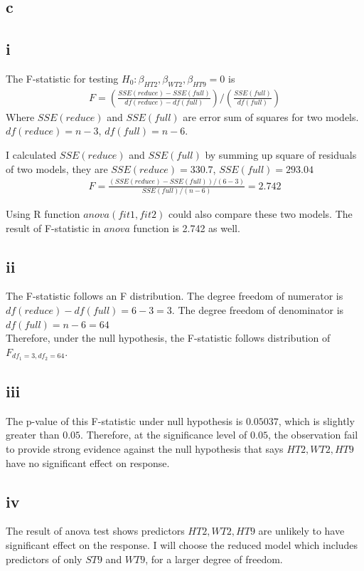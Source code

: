 \documentclass[11pt,letterpaper]{article}
\begin{document}
\subsection*{c}
\subsection*{i}
\noindent The F-statistic for testing $H_0: \beta_{HT2}, \beta_{WT2}, \beta_{HT9} = 0$ is 
\begin{align*}
F = (\frac{SSE(reduce) - SSE(full)}{df(reduce) - df(full)}) / (\frac{SSE(full)}{df(full)})
\end{align*}
\noindent Where $SSE(reduce)$ and $SSE(full)$ are error sum of squares for two models. $df(reduce) = n - 3$, $df(full) = n - 6$.

\noindent I calculated $SSE(reduce)$ and $SSE(full)$ by summing up square of residuals of two models, they are $SSE(reduce) = 330.7$, $SSE(full) = 293.04$ \\
\begin{align*}
F = \frac{(SSE(reduce) - SSE(full)) / (6 - 3)}{SSE(full) / (n - 6)} = 2.742
\end{align*}

\noindent Using R function $anova(fit1, fit2)$ could also compare these two models. The result of F-statistic in $anova$ function is 2.742 as well. 

\subsection*{ii}
\noindent The F-statistic follows an F distribution. The degree freedom of numerator is $df(reduce) - df(full) = 6-3=3$. The degree freedom of denominator is $df(full) = n - 6  = 64$ \\
\noindent Therefore, under the null hypothesis, the F-statistic follows distribution of $F_{df_1=3, df_2=64}$.

\subsection*{iii}
\noindent The p-value of this F-statistic under null hypothesis is $0.05037 $, which is slightly greater than $0.05$. Therefore, at the significance level of $0.05$, the observation fail to provide strong evidence against the null hypothesis that says $HT2, WT2, HT9$ have no significant effect on response. 

\subsection*{iv}
\noindent The result of anova test shows predictors $HT2, WT2, HT9$ are unlikely to have significant effect on the response. I will choose the reduced model which includes predictors of only $ST9$ and $WT9$, for a larger degree of freedom. 
\end{document}
